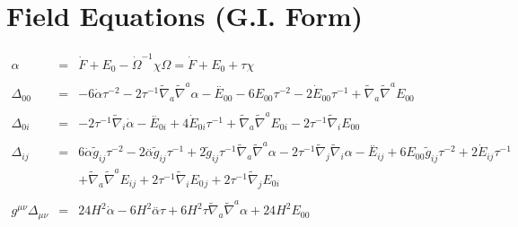 \documentclass[10pt,letterpaper]{article}
\numberwithin{equation}{section}
\begin{document}
\section{Field Equations (G.I. Form)}
\begin{eqnarray}
\alpha &=&\dot{F} + E_{0}{} -  \dot{\Omega}^{-1} \chi \Omega  = \dot{F} + E_{0}{} + \tau \chi  
\\ \nonumber\\
\Delta_{00}&=& -6 \dot{\alpha} \tau^{-2} - 2 \tau^{-1} \tilde{\nabla}_{a}\tilde{\nabla}^{a}\alpha - \overset{..}{E}_{00}{} - 6 E_{00}{} \tau^{-2} - 2 \dot{E}_{00}{} \tau^{-1} + \tilde{\nabla}_{a}\tilde{\nabla}^{a}E_{00}{}
\\  \nonumber\\ 
\Delta_{0i}&=& -2 \tau^{-1} \tilde{\nabla}_{i}\dot{\alpha}- \overset{..}{E}_{0i}{} + 4 \dot{E}_{0i}{} \tau^{-1} + \tilde{\nabla}_{a}\tilde{\nabla}^{a}E_{0i}{} - 2 \tau^{-1} \tilde{\nabla}_{i}E_{00}{}
\\  \nonumber\\ 
\Delta_{ij}&=& 6 \dot{\alpha} \tilde{g}_{ij} \tau^{-2} - 2 \overset{..}{\alpha} \tilde{g}_{ij} \tau^{-1} + 2 \tilde{g}_{ij} \tau^{-1} \tilde{\nabla}_{a}\tilde{\nabla}^{a}\alpha - 2 \tau^{-1} \tilde{\nabla}_{j}\tilde{\nabla}_{i}\alpha - \overset{..}{E}_{ij} + 6 E_{00}{} \tilde{g}_{ij} \tau^{-2} + 2 \dot{E}_{ij} \tau^{-1} \nonumber \\ 
&& + \tilde{\nabla}_{a}\tilde{\nabla}^{a}E_{ij} + 2 \tau^{-1} \tilde{\nabla}_{i}E_{0}{}_{j} + 2 \tau^{-1} \tilde{\nabla}_{j}E_{0i}{}
\\  \nonumber\\ 
g^{\mu\nu}\Delta_{\mu\nu}&=& 24 H^2 \dot{\alpha} - 6 H^2 \overset{..}{\alpha} \tau + 6 H^2 \tau \tilde{\nabla}_{a}\tilde{\nabla}^{a}\alpha +24 H^2 E_{00}{}
\end{eqnarray}
%
\end{document}
